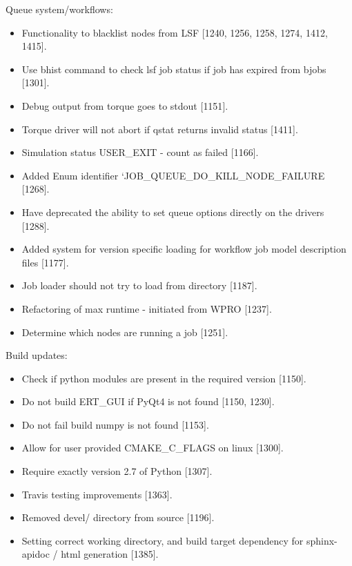 \documentclass[letterpaper,10pt,english]{sphinxmanual}
\begin{document}
Queue system/workflows:
\begin{itemize}
\item {} 
Functionality to blacklist nodes from LSF {[}1240, 1256, 1258, 1274, 1412, 1415{]}.

\item {} 
Use bhist command to check lsf job status if job has expired from bjobs {[}1301{]}.

\item {} 
Debug output from torque goes to stdout {[}1151{]}.

\item {} 
Torque driver will not abort if qstat returns invalid status {[}1411{]}.

\item {} 
Simulation status USER\_EXIT - count as failed {[}1166{]}.

\item {} 
Added Enum identifier ‘JOB\_QUEUE\_DO\_KILL\_NODE\_FAILURE {[}1268{]}.

\item {} 
Have deprecated the ability to set queue options directly on the drivers {[}1288{]}.

\item {} 
Added system for version specific loading for workflow job model
description files {[}1177{]}.

\item {} 
Job loader should not try to load from directory {[}1187{]}.

\item {} 
Refactoring of max runtime - initiated from WPRO {[}1237{]}.

\item {} 
Determine which nodes are running a job {[}1251{]}.

\end{itemize}

Build updates:
\begin{itemize}
\item {} 
Check if python modules are present in the required version {[}1150{]}.

\item {} 
Do not build ERT\_GUI if PyQt4 is not found {[}1150, 1230{]}.

\item {} 
Do not fail build numpy is not found {[}1153{]}.

\item {} 
Allow for user provided CMAKE\_C\_FLAGS on linux {[}1300{]}.

\item {} 
Require exactly version 2.7 of Python {[}1307{]}.

\item {} 
Travis testing improvements {[}1363{]}.

\item {} 
Removed devel/ directory from source {[}1196{]}.

\item {} 
Setting correct working directory, and build target dependency
for sphinx-apidoc / html generation {[}1385{]}.

\end{itemize}
\end{document}
